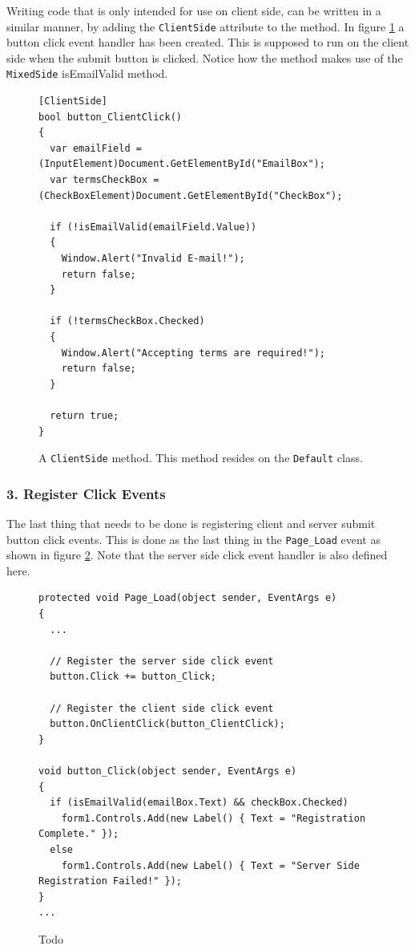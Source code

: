 Writing code that is only intended for use on client side, can be written in a similar manner, by adding the \texttt{ClientSide} attribute to the method. In figure \ref{fig:write_mics_code_clienside} a button click event handler has been created. This is supposed to run on the client side when the submit button is clicked. Notice how the method makes use of the \texttt{MixedSide} isEmailValid method.


\begin{figure}[H]
\begin{lstlisting}[language=CSharp,classoffset=1,morekeywords={Default,MiCSPage,Button,CheckBox,TextBox,EventArgs,ClientSide,InputElement,Document,CheckBoxElement,Window,MixedSide,Regex}]
[ClientSide]
bool button_ClientClick()
{
  var emailField = (InputElement)Document.GetElementById("EmailBox");
  var termsCheckBox = (CheckBoxElement)Document.GetElementById("CheckBox");
  
  if (!isEmailValid(emailField.Value))
  {
    Window.Alert("Invalid E-mail!");
    return false;
  }
  
  if (!termsCheckBox.Checked)
  {
    Window.Alert("Accepting terms are required!");
    return false;
  }
  
  return true;
}
\end{lstlisting}
\caption{A \texttt{ClientSide} method. This method resides on the \texttt{Default} class.}
\label{fig:write_mics_code_clienside}
\end{figure}

\subsubsection{3. Register Click Events} %
\label{ssub:3_register_click_events}
	The last thing that needs to be done is registering client and server submit button click events. This is done as the last thing in the \texttt{Page\_Load} event as shown in figure \ref{fig:register_events}. Note that the server side click event handler is also defined here.
\begin{figure}[H]
\begin{lstlisting}[language=CSharp,classoffset=1,morekeywords={Default,MiCSPage,Button,CheckBox,TextBox,EventArgs,ClientSide,InputElement,Document,CheckBoxElement,Window,MixedSide,Regex}]
protected void Page_Load(object sender, EventArgs e)
{
  ...

  // Register the server side click event
  button.Click += button_Click;

  // Register the client side click event
  button.OnClientClick(button_ClientClick);
}

void button_Click(object sender, EventArgs e)
{
  if (isEmailValid(emailBox.Text) && checkBox.Checked)
    form1.Controls.Add(new Label() { Text = "Registration Complete." });
  else
    form1.Controls.Add(new Label() { Text = "Server Side Registration Failed!" });
}
...
\end{lstlisting}
\caption{Todo}
\label{fig:register_events}
\end{figure}

